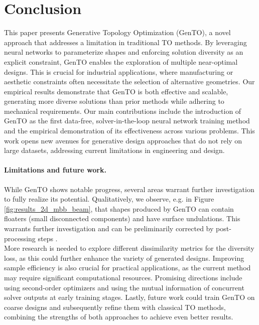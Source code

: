 \section{Conclusion}



This paper presents Generative Topology Optimization (GenTO), a novel approach that addresses a limitation in traditional TO methods.
By leveraging neural networks to parameterize shapes and enforcing solution diversity as an explicit constraint, GenTO enables the exploration of multiple near-optimal designs.
This is crucial for industrial applications, where manufacturing or aesthetic constraints often necessitate the selection of alternative geometries.
Our empirical results demonstrate that GenTO is both effective and scalable, generating more diverse solutions than prior methods while adhering to mechanical requirements.
Our main contributions include the introduction of GenTO as the first data-free, solver-in-the-loop neural network training method and the empirical demonstration of its effectiveness across various problems.
This work opens new avenues for generative design approaches that do not rely on large datasets, addressing current limitations in engineering and design.


\paragraph{Limitations and future work.}
While GenTO shows notable progress, several areas warrant further investigation to fully realize its potential.
Qualitatively, we observe, e.g. in Figure \ref{fig:results_2d_mbb_beam}, that shapes produced by GenTO can contain floaters (small disconnected components) and have surface undulations.
This warrants further investigation and can be preliminarily corrected by post-processing steps \citep{subedi2020review}.
\\
More research is needed to explore different dissimilarity metrics for the diversity loss, as this could further enhance the variety of generated designs.
Improving sample efficiency is also crucial for practical applications, as the current method may require significant computational resources.
Promising directions include using second-order optimizers and using the mutual information of concurrent solver outputs at early training stages. 
Lastly, future work could train GenTO on coarse designs and subsequently refine them with classical TO methods, combining the strengths of both approaches to achieve even better results.
